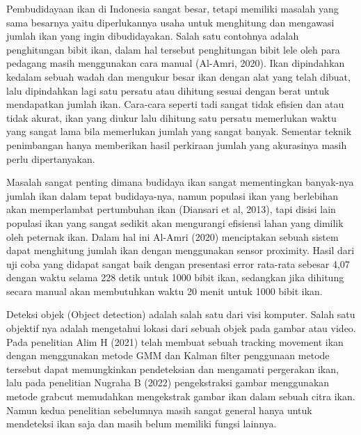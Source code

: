 Pembudidayaan ikan di Indonesia sangat besar, tetapi memiliki masalah yang sama besarnya yaitu diperlukannya usaha 
untuk menghitung dan mengawasi jumlah ikan yang ingin dibudidayakan. Salah satu contohnya adalah penghitungan bibit ikan, 
dalam hal tersebut penghitungan bibit lele oleh para pedagang masih menggunakan cara manual (Al-Amri, 2020). 
Ikan dipindahkan kedalam sebuah wadah dan mengukur besar ikan dengan alat yang telah dibuat, lalu dipindahkan lagi satu persatu 
atau dihitung sesuai dengan berat untuk mendapatkan jumlah ikan. Cara-cara seperti tadi sangat tidak efisien dan atau tidak akurat, 
ikan yang diukur lalu dihitung satu persatu memerlukan waktu yang sangat lama bila memerlukan jumlah yang sangat banyak. 
Sementar teknik penimbangan hanya memberikan hasil perkiraan jumlah yang akurasinya masih perlu dipertanyakan. 

Masalah sangat penting dimana budidaya ikan sangat mementingkan banyak-nya jumlah ikan dalam tepat budidaya-nya, 
namun populasi ikan yang berlebihan akan memperlambat pertumbuhan ikan (Diansari et al, 2013), 
tapi disisi lain populasi ikan yang sangat sedikit akan mengurangi efisiensi lahan yang dimilik oleh peternak ikan. 
Dalam hal ini Al-Amri (2020) menciptakan sebuah sistem dapat menghitung jumlah ikan dengan menggunakan sensor proximity. 
Hasil dari uji coba yang didapat sangat baik dengan presentasi error rata-rata sebesar 4,07 dengan waktu selama 228 detik untuk 1000 bibit ikan, 
sedangkan jika dihitung secara manual akan membutuhkan waktu 20 menit untuk 1000 bibit ikan. 

Deteksi objek (Object detection) adalah salah satu dari visi komputer. Salah satu objektif nya adalah mengetahui lokasi dari sebuah objek pada gambar atau video. 
Pada penelitian Alim H (2021) telah membuat sebuah tracking movement ikan dengan menggunakan metode GMM dan Kalman filter penggunaan metode tersebut dapat memungkinkan 
pendeteksian dan mengamati pergerakan ikan, lalu pada penelitian Nugraha B (2022) pengekstraksi gambar menggunakan metode grabcut memudahkan mengekstrak gambar ikan dalam sebuah citra ikan. 
Namun kedua penelitian sebelumnya masih sangat general hanya untuk mendeteksi ikan saja dan masih belum memiliki fungsi lainnya. 

